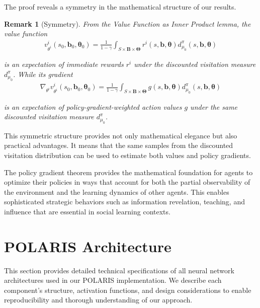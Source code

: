 \documentclass[a4paper,12pt]{report}
\newtheorem{remark}{Remark}
\begin{document}
The proof reveals a symmetry in the mathematical structure of our results.
\begin{remark}[Symmetry]
    From the Value Function as Inner Product lemma, the value function
    \begin{align}
        v^{i}_{\theta^i}(s_{0}, \boldsymbol{b}_{0}, \boldsymbol{\theta}_{0}) = \frac{1}{1-\gamma}\int_{S \times \boldsymbol{B} \times \boldsymbol{\Theta}}r^{i}(s, \boldsymbol{b}, \boldsymbol{\theta}) d^{\pi}_{\mu_0}(s, \boldsymbol{b}, \boldsymbol{\theta})
    \end{align}

    is an expectation of immediate rewards $r^{i}$ under the discounted visitation
    measure $d^{\pi}_{\mu_0}$. While its gradient
    \begin{align}
        \nabla_{\theta^i}v^{i}_{\theta^i}(s_{0}, \boldsymbol{b}_{0}, \boldsymbol{\theta}_{0}) = \frac{1}{1-\gamma}\int_{S \times \boldsymbol{B} \times \boldsymbol{\Theta}}g(s, \boldsymbol{b}, \boldsymbol{\theta}) d^{\pi}_{\mu_0}(s, \boldsymbol{b}, \boldsymbol{\theta})
    \end{align}

    is an expectation of policy-gradient-weighted action values $g$ under the same
    discounted visitation measure $d^{\pi}_{\mu_0}$.
\end{remark}
This symmetric structure provides not only mathematical elegance but also
practical advantages. It means that the same samples from the discounted visitation
distribution can be used to estimate both values and policy gradients.

The policy gradient theorem provides the mathematical foundation for agents to optimize
their policies in ways that account for both the partial observability of the environment
and the learning dynamics of other agents. This enables sophisticated strategic
behaviors such as information revelation, teaching, and influence that are
essential in social learning contexts.

\chapter{POLARIS Architecture}
\label{appendix:neural_architectures}

This section provides detailed technical specifications of all neural network architectures used in our POLARIS implementation. We describe each component's structure, activation functions, and design considerations to enable reproducibility and thorough understanding of our approach.
\end{document}
